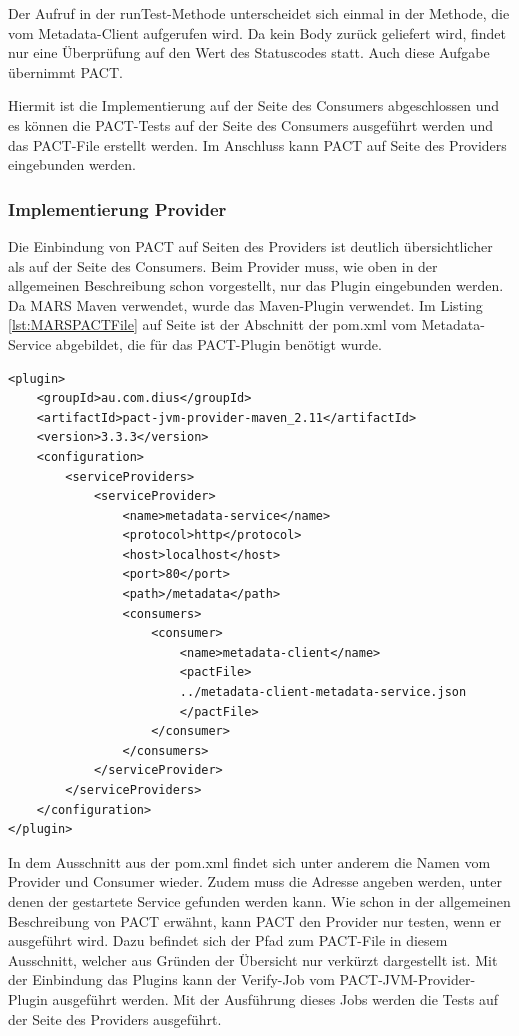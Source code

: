\documentclass{llncs}
\begin{document}
Der Aufruf in der runTest-Methode unterscheidet sich einmal in der Methode, die vom Metadata-Client aufgerufen wird. Da kein Body zurück geliefert wird, findet nur eine Überprüfung auf den Wert des Statuscodes statt. Auch diese Aufgabe übernimmt PACT.

Hiermit ist die Implementierung auf der Seite des Consumers abgeschlossen und es können die PACT-Tests auf der Seite des Consumers ausgeführt werden und das PACT-File erstellt werden. Im Anschluss kann PACT auf Seite des Providers eingebunden werden.
\subsubsection{Implementierung Provider}
Die Einbindung von PACT auf Seiten des Providers ist deutlich übersichtlicher als auf der Seite des Consumers. Beim Provider muss, wie oben in der allgemeinen Beschreibung schon vorgestellt, nur das Plugin eingebunden werden. Da MARS Maven verwendet, wurde das Maven-Plugin verwendet. Im Listing \ref{lst:MARSPACTFile} auf Seite \pageref{lst:MARSPACTFile} ist der Abschnitt der pom.xml vom Metadata-Service abgebildet, die für das PACT-Plugin benötigt wurde. 

\lstset{language = Java}
\begin{lstlisting}[caption=Eintrag in der pom.xml,label={lst:MARSPACTFile}]
<plugin>
    <groupId>au.com.dius</groupId>
    <artifactId>pact-jvm-provider-maven_2.11</artifactId>
    <version>3.3.3</version>
    <configuration>
        <serviceProviders>
            <serviceProvider>
                <name>metadata-service</name>
                <protocol>http</protocol>
                <host>localhost</host>
                <port>80</port>
                <path>/metadata</path>
                <consumers>
                    <consumer>
                        <name>metadata-client</name>
                        <pactFile>
                        ../metadata-client-metadata-service.json
                        </pactFile>
                    </consumer>
                </consumers>
            </serviceProvider>
        </serviceProviders>
    </configuration>
</plugin>
\end{lstlisting}

In dem Ausschnitt aus der pom.xml findet sich unter anderem die Namen vom Provider und Consumer wieder. Zudem muss die Adresse angeben werden, unter denen der gestartete Service gefunden werden kann. Wie schon in der allgemeinen Beschreibung von PACT erwähnt, kann PACT den Provider nur testen, wenn er ausgeführt wird. Dazu befindet sich der Pfad zum PACT-File in diesem Ausschnitt, welcher aus Gründen der Übersicht nur verkürzt dargestellt ist.
Mit der Einbindung das Plugins kann der Verify-Job vom  PACT-JVM-Provider-Plugin ausgeführt werden. Mit der Ausführung dieses Jobs werden die Tests auf der Seite des Providers ausgeführt.
\end{document}
